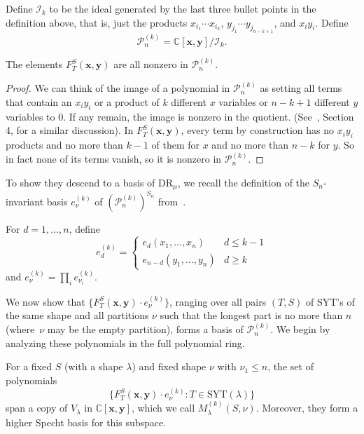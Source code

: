 \documentclass[ALCO,Unicode]{cedram}
\newcommand{\SYT}{\mathrm{SYT}}
\newcommand{\DR}{\mathrm{DR}}
\begin{document}
\begin{definition}
	Define $\mathcal{I}_k$ to be the ideal generated by  the last three bullet points in the definition above, that is, just the products $x_{i_1}\cdots x_{i_k}$, $y_{j_1}\cdots y_{j_{n-k+1}}$, and $x_iy_i$.  Define $$\mathcal{P}_{n}^{(k)}=\mathbb{C}[\mathbf{x},\mathbf{y}]/\mathcal{I}_k.$$
\end{definition}

\begin{lemma}
	The elements $F_T^S(\mathbf{x},\mathbf{y})$ are all nonzero in $\mathcal{P}_n^{(k)}$.
\end{lemma}

\begin{proof}
	We can think of the image of a polynomial in $\mathcal{P}_n^{(k)}$ as setting all terms that contain an $x_iy_i$ or a product of $k$ different $x$ variables or $n-k+1$ different $y$ variables to $0$.  If any remain, the image is nonzero in the quotient. (See~\cite{HookBases}, Section 4, for a similar discussion).  In $F_T^S(\mathbf{x},\mathbf{y})$, every term by construction has no $x_iy_i$ products and no more than $k-1$ of them for $x$ and no more than $n-k$ for $y$.  So in fact none of its terms vanish, so it is nonzero in $\mathcal{P}_n^{(k)}$.
\end{proof}

To show they descend to a basis of $\DR_\mu$, we recall the definition of the $S_n$-invariant basis $e_\nu^{(k)}$ of $(\mathcal{P}_n^{(k)})^{S_n}$ from~\cite{HookBases}.

\begin{definition}
	For $d=1,\ldots,n$, define $$e_d^{(k)}=\begin{cases}
	e_d(x_1,\ldots,x_n) & d\le k-1 \\
	e_{n-d}(y_1,\ldots,y_n) & d\ge k
	\end{cases}$$ and $e_\nu^{(k)}=\prod_i e_{\nu_i}^{(k)}$.
\end{definition}

We now show that $\{F_T^S(\mathbf{x},\mathbf{y})\cdot e_\nu^{(k)}\}$, ranging over all pairs $(T,S)$ of SYT's of the same shape and all partitions $\nu$ such that the longest part is no more than $n$ (where~$\nu$ may be the empty partition), forms a basis of $\mathcal{P}_n^{(k)}$.  We begin by analyzing these polynomials in the full polynomial ring.

\begin{lemma}\label{lem:MS}
	For a fixed $S$ (with a shape $\lambda$) and fixed shape $\nu$ with $\nu_1\le n$, the set of polynomials $$\{F_T^S(\mathbf{x},\mathbf{y})\cdot e_\nu^{(k)}:T\in \SYT(\lambda)\}$$ span a copy of $V_\lambda$ in $\mathbb{C}[\mathbf{x},\mathbf{y}]$, which we call $M^{(k)}_{\lambda}(S,\nu)$.  Moreover, they form a higher Specht basis for this subspace.
\end{lemma}
\end{document}
